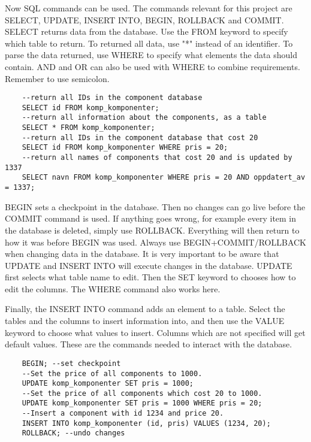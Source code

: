 Now SQL commands can be used. The commands relevant for this project are SELECT, UPDATE, INSERT INTO, BEGIN, ROLLBACK and COMMIT. SELECT returns data from the database. Use the FROM keyword to specify which table to return. To returned all data, use "*" instead of an identifier. To parse the data returned,  use WHERE to specify what elements the data should contain. AND and OR can also be used with WHERE to combine requirements. Remember to use semicolon.
\begin{verbatim}
    --return all IDs in the component database
    SELECT id FROM komp_komponenter; 
    --return all information about the components, as a table
    SELECT * FROM komp_komponenter; 
    --return all IDs in the component database that cost 20
    SELECT id FROM komp_komponenter WHERE pris = 20; 
    --return all names of components that cost 20 and is updated by 1337
    SELECT navn FROM komp_komponenter WHERE pris = 20 AND oppdatert_av = 1337;
\end{verbatim}

BEGIN sets a checkpoint in the database. Then no changes can go live before the COMMIT command is used. If anything goes wrong, for example every item in the database is deleted, simply use ROLLBACK. Everything will then return to how it was before BEGIN was used. Always use BEGIN+COMMIT/ROLLBACK when changing data in the database. It is very important to be aware that UPDATE and INSERT INTO will execute changes in the database. UPDATE first selects what table name to edit. Then the SET keyword to chooses how to edit the columns. The WHERE command also works here. 

Finally, the INSERT INTO command adds an element to a table. Select the tables and the columns to insert information into, and then use the VALUE keyword to choose what values to insert. Columns which are not specified will get default values. These are the commands needed to interact with the database.

\begin{verbatim}
    BEGIN; --set checkpoint
    --Set the price of all components to 1000.
    UPDATE komp_komponenter SET pris = 1000;  
    --Set the price of all components which cost 20 to 1000.
    UPDATE komp_komponenter SET pris = 1000 WHERE pris = 20; 
    --Insert a component with id 1234 and price 20.
    INSERT INTO komp_komponenter (id, pris) VALUES (1234, 20);
    ROLLBACK; --undo changes
\end{verbatim}

